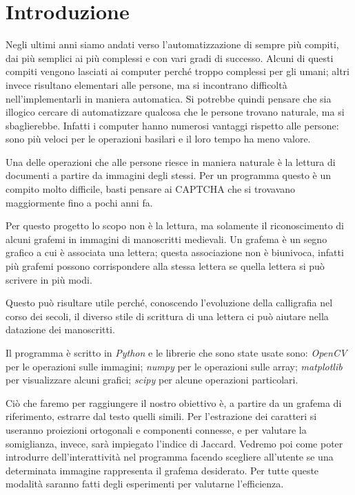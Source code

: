 \chapter{Introduzione}\label{ch:introduzione}

Negli ultimi anni siamo andati verso l'automatizzazione di sempre pi\`u compiti, dai pi\`u semplici ai pi\`u complessi e con vari gradi di successo. Alcuni di questi compiti vengono lasciati ai computer perch\'e troppo complessi per gli umani; altri invece risultano elementari alle persone, ma si incontrano difficolt\`a nell'implementarli in maniera automatica. Si potrebbe quindi pensare che sia illogico cercare di automatizzare qualcosa che le persone trovano naturale, ma si sbaglierebbe. Infatti i computer hanno numerosi vantaggi rispetto alle persone: sono pi\`u veloci per le operazioni basilari e il loro tempo ha meno valore.

Una delle operazioni che alle persone riesce in maniera naturale \`e la lettura di documenti a partire da immagini degli stessi. Per un programma questo \`e un compito molto difficile, basti pensare ai CAPTCHA che si trovavano maggiormente fino a pochi anni fa.

Per questo progetto lo scopo non \`e la lettura, ma solamente il riconoscimento di alcuni grafemi in immagini di manoscritti medievali. Un grafema \`e un segno grafico a cui \`e associata una lettera; questa associazione non \`e biunivoca, infatti pi\`u grafemi possono corrispondere alla stessa lettera se quella lettera si pu\`o scrivere in pi\`u modi.

Questo pu\`o risultare utile perch\'e, conoscendo l'evoluzione della calligrafia nel corso dei secoli, il diverso stile di scrittura di una lettera ci pu\`o aiutare nella datazione dei manoscritti.

Il programma \`e scritto in \emph{Python} e le librerie che sono state usate sono:
\emph{OpenCV}\cite{opencv_library} per le operazioni sulle immagini;
\emph{numpy}\cite{oliphant2006guide, van2011numpy} per le operazioni sulle array;
\emph{matplotlib}\cite{Hunter:2007} per visualizzare alcuni grafici;
\emph{scipy}\cite{2020SciPy-NMeth} per alcune operazioni particolari.

Ci\`o che faremo per raggiungere il nostro obiettivo \`e, a partire da un grafema di riferimento, estrarre dal testo quelli simili. Per l'estrazione dei caratteri si useranno proiezioni ortogonali e componenti connesse, e per valutare la somiglianza, invece, sar\`a impiegato l'indice di Jaccard. Vedremo poi come poter introdurre dell'interattivit\`a nel programma facendo scegliere all'utente se una determinata immagine rappresenta il grafema desiderato. Per tutte queste modalit\`a saranno fatti degli esperimenti per valutarne l'efficienza.